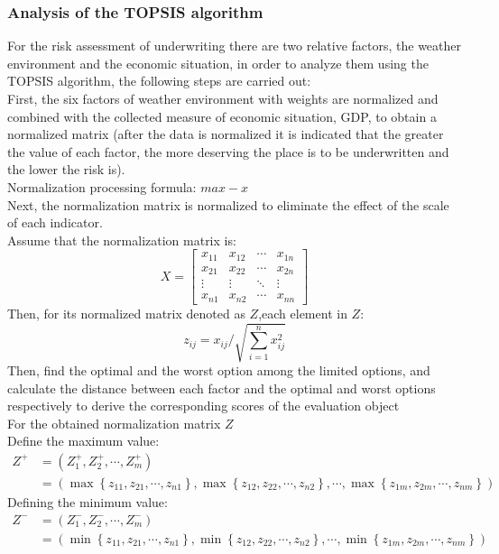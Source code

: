 \documentclass{mcmthesis}
\begin{document}
\subsubsection{Analysis of the TOPSIS algorithm}
For the risk assessment of underwriting there are two relative factors, the weather environment and the economic situation, in order to analyze them using the TOPSIS algorithm, the following steps are carried out:\\
First, the six factors of weather environment with weights are normalized and combined with the collected measure of economic situation, GDP, to obtain a normalized matrix (after the data is normalized it is indicated that the greater the value of each factor, the more deserving the place is to be underwritten and the lower the risk is). \\
Normalization processing formula:           $max-x$\\
Next, the normalization matrix is normalized to eliminate the effect of the scale of each indicator. \\
Assume that the normalization matrix is: 
$$
X=\left[\begin{array}{cccc}
	x_{11} & x_{12} & \cdots & x_{1 n} \\
	x_{21} & x_{22} & \cdots & x_{2 n} \\
	\vdots & \vdots & \ddots & \vdots \\
	x_{n 1} & x_{n 2} & \cdots & x_{n n}
\end{array}\right]
$$
Then, for its normalized matrix denoted as $Z$,each element in $Z$:
$$
z_{i j}=x_{i j} / \sqrt{\sum_{i=1}^n x_{i j}^2}
$$
Then, find the optimal and the worst option among the limited options, and calculate the distance between each factor and the optimal and worst options respectively to derive the corresponding scores of the evaluation object \\
For the obtained normalization matrix $Z$\\
Define the maximum value:
$$
\begin{aligned}
	Z^{+} & =\left(Z_1^{+}, Z_2^{+}, \cdots, Z_m^{+}\right) \\
	& =\left(\max \left\{z_{11}, z_{21}, \cdots, z_{n 1}\right\}, \max \left\{z_{12}, z_{22}, \cdots, z_{n 2}\right\}, \cdots, \max \left\{z_{1 m}, z_{2 m}, \cdots, z_{n m}\right\}\right)
\end{aligned}
$$
Defining the minimum value:
$$
\begin{aligned}
	Z^{-} & =\left(Z_1^{-}, Z_2^{-}, \cdots, Z_m^{-}\right) \\
	& =\left(\min \left\{z_{11}, z_{21}, \cdots, z_{n 1}\right\}, \min \left\{z_{12}, z_{22}, \cdots, z_{n 2}\right\}, \cdots, \min \left\{z_{1 m}, z_{2 m}, \cdots, z_{n m}\right\}\right)
\end{aligned}
$$
\end{document}
